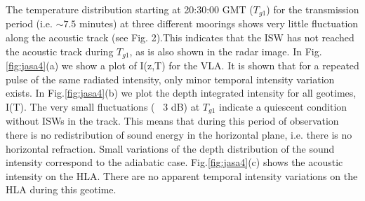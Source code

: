 The temperature distribution starting at 20:30:00 GMT ($T_{g1}$) for the
transmission period (i.e. $\sim7.5$ minutes) at three different moorings
shows very little fluctuation along the acoustic track (see Fig.
2).This indicates that the ISW has not reached the acoustic track
during $T_{g1}$, as is also shown in the radar image. In Fig.\ref{fig:jasa4}(a) we
show a plot of I(z,T) for the VLA. It is shown that for a repeated
pulse of the same radiated intensity, only minor temporal intensity
variation exists.  In Fig.\ref{fig:jasa4}(b) we plot the depth integrated
intensity for all geotimes, I(T).  The very small fluctuations (~ 3
dB) at $T_{g1}$ indicate a quiescent condition without ISWs in the track.
This means that during this period of observation there is no
redistribution of sound energy in the horizontal plane, i.e. there
is no horizontal refraction. Small variations of the depth
distribution of the sound intensity correspond to the adiabatic
case. Fig.\ref{fig:jasa4}(c) shows the acoustic intensity on the HLA. There are
no apparent temporal intensity variations on the HLA during this
geotime.


